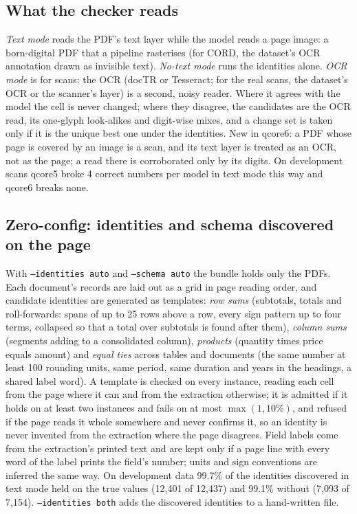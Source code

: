 \documentclass[10pt,twocolumn]{article}
\newcommand{\vq}[1]{\textsf{qcore#1}}
\newcommand{\code}[1]{\texttt{\small #1}}
\begin{document}
\subsection{What the checker reads}\label{sec:textmode}
\emph{Text mode} reads the PDF's text layer while the model reads a page image: a born-digital PDF that a pipeline rasterises (for CORD, the dataset's OCR annotation drawn as invisible text). \emph{No-text mode} runs the identities alone. \emph{OCR mode} is for scans: the OCR (docTR or Tesseract; for the real scans, the dataset's OCR or the scanner's layer) is a second, noisy reader. Where it agrees with the model the cell is never changed; where they disagree, the candidates are the OCR read, its one-glyph look-alikes and digit-wise mixes, and a change set is taken only if it is the unique best one under the identities. New in \vq{6}: a PDF whose page is covered by an image is a scan, and its text layer is treated as an OCR, not as the page; a read there is corroborated only by its digits. On development scans \vq{5} broke 4 correct numbers per model in text mode this way and \vq{6} breaks none.

\subsection{Zero-config: identities and schema discovered on the page}\label{sec:discover}
With \code{--identities auto} and \code{--schema auto} the bundle holds only the PDFs. Each document's records are laid out as a grid in page reading order, and candidate identities are generated as templates: \emph{row sums} (subtotals, totals and roll-forwards: spans of up to 25 rows above a row, every sign pattern up to four terms, collapsed so that a total over subtotals is found after them), \emph{column sums} (segments adding to a consolidated column), \emph{products} (quantity times price equals amount) and \emph{equal ties} across tables and documents (the same number at least 100 rounding units, same period, same duration and years in the headings, a shared label word). A template is checked on every instance, reading each cell from the page where it can and from the extraction otherwise; it is admitted if it holds on at least two instances and fails on at most $\max(1,10\%)$, and refused if the page reads it whole somewhere and never confirms it, so an identity is never invented from the extraction where the page disagrees. Field labels come from the extraction's printed text and are kept only if a page line with every word of the label prints the field's number; units and sign conventions are inferred the same way. On development data 99.7\% of the identities discovered in text mode held on the true values (12,401 of 12,437) and 99.1\% without (7,093 of 7,154). \code{--identities both} adds the discovered identities to a hand-written file.
\end{document}
